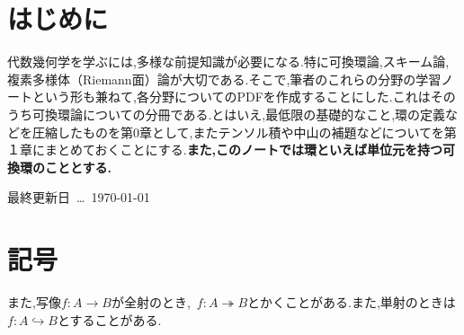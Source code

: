\documentclass[autodetect-engine,dvi=dvipdfmx,ja=standard,japaram={units}]{bxjsarticle} %
\begin{document}
	\nocite{*}
	\newpage
	\part*{はじめに}
	代数幾何学を学ぶには,多様な前提知識が必要になる.特に可換環論,スキーム論,複素多様体（Riemann面）論が大切である.そこで,筆者のこれらの分野の学習ノートという形も兼ねて,各分野についてのPDFを作成することにした.これはそのうち可換環論についての分冊である.とはいえ,最低限の基礎的なこと,環の定義などを圧縮したものを第0章として,またテンソル積や中山の補題などについてを第１章にまとめておくことにする.\textbf{また,このノートでは環といえば単位元を持つ可換環のこととする.}
	
	\hspace*{\fill}最終更新日~\dots~\today
	
	\part*{記号}
	
	
	また,写像$f:A\to B$が全射のとき,~$f:A\twoheadrightarrow B$とかくことがある.また,単射のときは$f:A\hookrightarrow B$とすることがある.
	\newpage
	
	\tableofcontents
	
	
	\def\prepartname{付録}
	\def\postpartname{}
	\thepartchange
%	 
	
	
	\printindex
	
	\newpage
	
	
\end{document}
